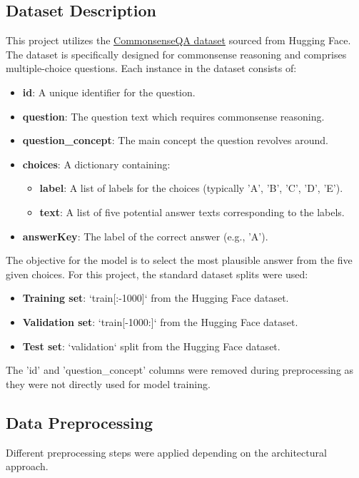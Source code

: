 \documentclass[10.5pt]{article}
\begin{document}
\subsection{Dataset Description}
This project utilizes the \href{https://huggingface.co/datasets/tau/commonsense_qa}{CommonsenseQA dataset} sourced from Hugging Face. The dataset is specifically designed for commonsense reasoning and comprises multiple-choice questions. Each instance in the dataset consists of:
\begin{itemize}
    \item \textbf{id}: A unique identifier for the question.
    \item \textbf{question}: The question text which requires commonsense reasoning.
    \item \textbf{question\_concept}: The main concept the question revolves around.
    \item \textbf{choices}: A dictionary containing:
        \begin{itemize}
            \item \textbf{label}: A list of labels for the choices (typically 'A', 'B', 'C', 'D', 'E').
            \item \textbf{text}: A list of five potential answer texts corresponding to the labels.
        \end{itemize}
    \item \textbf{answerKey}: The label of the correct answer (e.g., 'A').
\end{itemize}
The objective for the model is to select the most plausible answer from the five given choices. For this project, the standard dataset splits were used:
\begin{itemize}
    \item \textbf{Training set}: `train[:-1000]` from the Hugging Face dataset.
    \item \textbf{Validation set}: `train[-1000:]` from the Hugging Face dataset.
    \item \textbf{Test set}: `validation` split from the Hugging Face dataset.
\end{itemize}
The 'id' and 'question\_concept' columns were removed during preprocessing as they were not directly used for model training.

\subsection{Data Preprocessing}
Different preprocessing steps were applied depending on the architectural approach.
\end{document}
